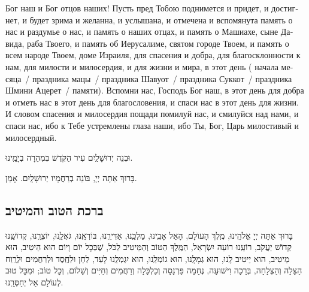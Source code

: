 \documentclass[11pt,twoside]{article}
\newcommand{\instructionru}[1]{%
\noindent{\russianprose\fontsize{5.2}{6.2}\textbf{\textit{#1}}}%
}
\begin{document}
{\begin{russian}
\instructionru{В новомесячие и праздники прибавляют:}
Бог наш и Бог отцов наших! Пусть пред Тобою поднимется и придет, и
достигнет, и будет зрима и желанна, и услышана, и отмечена и
вспомянута память о нас и раздумье о нас, и память о наших отцах, и
память о Машиахе, сыне Давида, раба Твоего, и память об Иерусалиме,
святом городе Твоем, и память о всем народе Твоем, доме Израиля, для
спасения и добра, для
благосклонности к нам, для милости и милосердия, и для жизни и мира, в
этот день
(%
начала месяца~/
праздника мацы~/
праздника Шавуот~/
праздника Суккот~/
праздника Шмини Ацерет~/
памяти).
Вспомни нас, Господь Бог наш, в этот день для добра и отметь нас в
этот день для благословения, и спаси нас в этот день для жизни. И
словом спасения и милосердия пощади помилуй нас, и смилуйся над нами,
и спаси нас, ибо к Тебе устремлены глаза наши, ибо Ты, Бог, Царь
милостивый и милосердный.\par
\end{russian}
}

\newpage

\begin{samepage}
{\centering
וּבְנֵה יְרוּשָׁלַֽיִם עִיר הַקֹּֽדֶשׁ בִּמְהֵרָה בְיָמֵֽינוּ.

{\Large{בָּרוּךְ אַתָּה יְיָ, בּוֹנֵה בְרַחֲמָיו יְרוּשָׁלָֽיִם. אָמֵן.}\par}}
\end{samepage}

\vfill%
\begin{samepage}
\subsection*{ברכת הטוב והמיטיב}
בָּרוּךְ אַתָּה יְיָ אֱלֹהֵֽינוּ, מֶֽלֶךְ הָעוֹלָם, הָאֵל אָבִֽינוּ, מַלְכֵּֽנוּ, אַדִּירֵֽנוּ, בּוֹרְאֵֽנוּ,
גֹּאֲלֵֽנוּ, יוֹצְרֵֽנוּ, קְדוֹשֵֽׁנוּ קְדוֹשׁ יַעֲקֹב, רוֹעֵֽנוּ רוֹעֵה יִשְׂרָאֵל, הַמֶּֽלֶךְ הַטּוֹב וְהַמֵּיטִיב
לַכֹּל, שֶׁבְּכׇל יוֹם וָיוֹם הוּא הֵיטִיב, הוּא מֵיטִיב, הוּא יֵיטִיב לָֽנוּ, הוּא גְמָלָֽנוּ, הוּא
גוֹמְלֵֽנוּ, הוּא יִגְמְלֵֽנוּ לָעַד, לְחֵן וּלְחֶֽסֶד וּלְרַחֲמִים וּלְרֶֽוַח הַצָּלָה וְהַצְלָחָה, בְּרָכָה
וִישׁוּעָה, נֶחָמָה פַּרְנָסָה וְכַלְכָּלָה וְרַחֲמִים וְחַיִּים וְשָׁלוֹם, וְכׇל טוֹב; וּמִכׇּל טוּב לְעוֹלָם
אַל יְחַסְּרֵֽנוּ.
\end{samepage}
\vfill%
\end{document}
